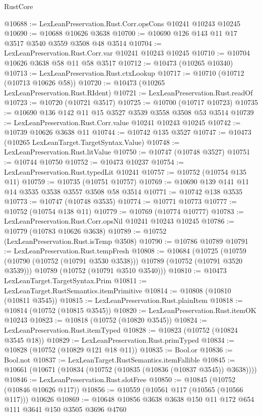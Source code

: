 \begin{lexlean}{RustCore}
\begin{coremodule}
@10688 := LexLeanPreservation.Rust.Corr.opsCons @10241 @10243 @10245
@10690 := @10688 @10626 @3638
@10700 := @10690 @126 @143 @11 @17 @3517 @3540 @3559 @3508 @48 @3514
@10704 := LexLeanPreservation.Rust.Corr.var @10241 @10243 @10245
@10710 := @10704 @10626 @3638 @58 @11 @58 @3517
@10712 := @10473 (@10265 @10340)
@10713 := LexLeanPreservation.Rust.ctxLookup
@10717 := @10710 (@10712 (@10713 @10626 @58))
@10720 := @10473 (@10265 LexLeanPreservation.Rust.RIdent)
@10721 := LexLeanPreservation.Rust.readOf
@10723 := @10720 (@10721 @3517)
@10725 := @10700 (@10717 @10723)
@10735 := @10690 @136 @142 @11 @15 @3527 @3539 @3558 @3508 @53 @3514
@10739 := LexLeanPreservation.Rust.Corr.value @10241 @10243 @10245
@10742 := @10739 @10626 @3638 @11
@10744 := @10742 @135 @3527
@10747 := @10473 (@10265 LexLeanTarget.TargetSyntax.Value)
@10748 := LexLeanPreservation.Rust.litValue
@10750 := @10747 (@10748 @3527)
@10751 := @10744 @10750
@10752 := @10473 @10237
@10754 := LexLeanPreservation.Rust.typedLit @10241
@10757 := @10752 (@10754 @135 @11)
@10759 := @10735 (@10751 @10757)
@10769 := @10690 @139 @141 @11 @14 @3535 @3538 @3557 @3508 @58 @3514
@10771 := @10742 @138 @3535
@10773 := @10747 (@10748 @3535)
@10774 := @10771 @10773
@10777 := @10752 (@10754 @138 @11)
@10779 := @10769 (@10774 @10777)
@10783 := LexLeanPreservation.Rust.Corr.opsNil @10241 @10243 @10245
@10786 := @10779 (@10783 @10626 @3638)
@10789 := @10752 (LexLeanPreservation.Rust.isTemp @3508)
@10790 := @10786 @10789
@10791 := LexLeanPreservation.Rust.tempFresh
@10808 := @10684
    (@10725
      (@10759 (@10790 (@10752 (@10791 @3530 @3538))) @10789 (@10752 (@10791 @3520 @3539)))
      @10789
      (@10752 (@10791 @3510 @3540)))
@10810 := @10473 LexLeanTarget.TargetSyntax.Prim
@10811 := LexLeanTarget.RustSemantics.itemPrimitive
@10814 := @10808 (@10810 (@10811 @3545))
@10815 := LexLeanPreservation.Rust.plainItem
@10818 := @10814 (@10752 (@10815 @3545))
@10820 := LexLeanPreservation.Rust.itemOK @10243
@10823 := @10818 (@10752 (@10820 @3545))
@10824 := LexLeanPreservation.Rust.itemTyped
@10828 := @10823 (@10752 (@10824 @3545 @18))
@10829 := LexLeanPreservation.Rust.primTyped
@10834 := @10828 (@10752 (@10829 @121 @18 @11))
@10835 := Bool.or
@10836 := Bool.not
@10837 := LexLeanTarget.RustSemantics.itemFallible
@10845 := @10661 (@10671 (@10834 (@10752 (@10835 (@10836 (@10837 @3545)) @3638))))
@10846 := LexLeanPreservation.Rust.slotFree
@10850 := @10845 (@10752 (@10846 @10626 @117))
@10856 := @10559 (@10561 @117 (@10565 (@10566 @117))) @10626
@10869 := @10648 @10856 @3638 @3638 @150 @11 @172 @654 @111 @3641 @150 @3505 @3696 @4760

\end{coremodule}
\end{lexlean}
